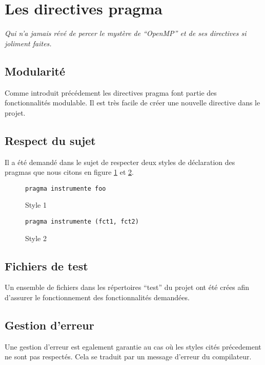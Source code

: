 %

\section{Les directives pragma}

\emph{Qui n'a jamais révé de percer le mystère de ``OpenMP'' et de ses directives si joliment faites.}

\subsection{Modularité}

Comme introduit précédement les directives pragma font partie des fonctionnalités modulable. Il est très facile de créer une nouvelle directive dans le projet.

\subsection{Respect du sujet}

Il a été demandé dans le sujet de respecter deux styles de déclaration des pragmas que nous citons en figure \ref{fig:style1} et \ref{fig:style2}.

\begin{figure}[here]
  \centering
  \verb#pragma instrumente foo#
  \caption{Style 1}
  \label{fig:style1}
\end{figure}

\begin{figure}[here]
  \centering
  \verb#pragma instrumente (fct1, fct2)#
  \caption{Style 2}
  \label{fig:style2}
\end{figure}

\subsection{Fichiers de test}

Un ensemble de fichiers dans les répertoires ``test'' du projet ont été crées afin d'assurer le fonctionnement des fonctionnalités demandées.

\subsection{Gestion d'erreur}

Une gestion d'erreur est egalement garantie au cas où les styles cités précedement ne sont pas respectés. Cela se traduit par un message d'erreur du compilateur.
